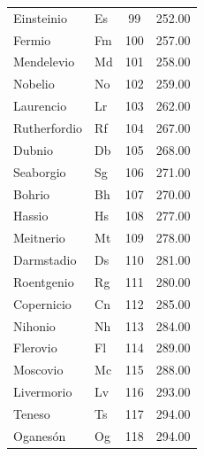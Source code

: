 \documentclass[12pt]{article}
\begin{document}
\begin{longtable}{llcc}
Einsteinio & Es & 99 & 252.00 \\
Fermio & Fm & 100 & 257.00 \\
Mendelevio & Md & 101 & 258.00 \\
Nobelio & No & 102 & 259.00 \\
Laurencio & Lr & 103 & 262.00 \\
Rutherfordio & Rf & 104 & 267.00 \\
Dubnio & Db & 105 & 268.00 \\
Seaborgio & Sg & 106 & 271.00 \\
Bohrio & Bh & 107 & 270.00 \\
Hassio & Hs & 108 & 277.00 \\
Meitnerio & Mt & 109 & 278.00 \\
Darmstadio & Ds & 110 & 281.00 \\
Roentgenio & Rg & 111 & 280.00 \\
Copernicio & Cn & 112 & 285.00 \\
Nihonio & Nh & 113 & 284.00 \\
Flerovio & Fl & 114 & 289.00 \\
Moscovio & Mc & 115 & 288.00 \\
Livermorio & Lv & 116 & 293.00 \\
Teneso & Ts & 117 & 294.00 \\
Oganesón & Og & 118 & 294.00 \\
\end{longtable}
\end{document}
